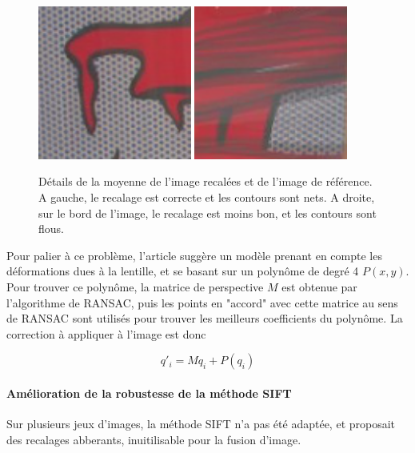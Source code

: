 \documentclass[12pt,a4paper]{article}
\begin{document}
\begin{figure}[H]
  \centering
  \includegraphics[width=0.45\textwidth]{Fig/Recalage_OK.png}
  \includegraphics[width=0.45\textwidth]{Fig/Recalage_flou.png}
  \caption{Détails de la moyenne de l'image recalées et de l'image de référence. A gauche, le recalage est correcte et les contours sont nets. A droite, sur le bord de l'image, le recalage est moins bon, et les contours sont flous.}
\end{figure}

Pour palier à ce problème, l'article suggère un modèle prenant en compte les déformations dues à la lentille, et se basant sur un polynôme de degré 4 $P(x,y)$. Pour trouver ce polynôme, la matrice de perspective $M$ est obtenue par l'algorithme de RANSAC, puis les points en "accord" avec cette matrice au sens de RANSAC sont utilisés pour trouver les meilleurs coefficients du polynôme. La correction à appliquer à l'image est donc 

$$ q'_i = M q_i + P(q_i) $$

\paragraph{Amélioration de la robustesse de la méthode SIFT}
Sur plusieurs jeux d'images, la méthode SIFT n'a pas été adaptée, et proposait des recalages abberants, inuitilisable pour la fusion d'image.
\end{document}
